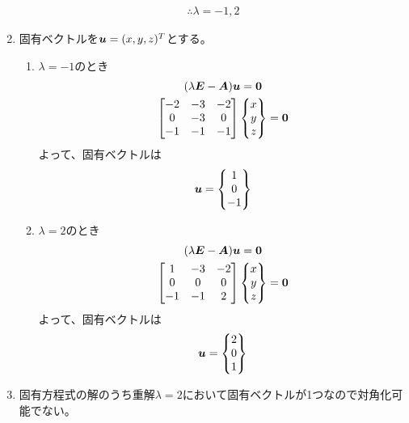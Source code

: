 \begin{ans*}
\begin{enumerate}[label=(\arabic*)]
    \begin{gather}
      \therefore \lambda = -1, 2 
    \end{gather}
    \item 固有ベクトルを${\bm{u}} = (x,y,z)^T$とする。
    \begin{enumerate}[label=(\roman*)]
      \item $\lambda = -1$のとき
      \begin{gather}
        (\lambda\bm{E} - \bm{A}){\bm{u}} = \bm{0} \\
        \begin{bmatrix}
          -2& -3& -2 \\
          0& -3& 0 \\
          -1& -1& -1 \\
        \end{bmatrix}
        \begin{Bmatrix}
          x \\ y \\ z
        \end{Bmatrix}
        =\bm{0} \\
      \end{gather}
      よって、固有ベクトルは
      \begin{gather}
        {\bm{u}} =
        \begin{Bmatrix}
          1 \\ 0 \\ -1
        \end{Bmatrix}
      \end{gather}
      \item $\lambda = 2$のとき
      \begin{gather}
        (\lambda\bm{E} - \bm{A}){\bm{u}} = \bm{0} \\
        \begin{bmatrix}
          1& -3& -2 \\
          0& 0& 0 \\
          -1& -1& 2
        \end{bmatrix}
        \begin{Bmatrix}
          x \\ y \\ z
        \end{Bmatrix}
        =\bm{0} \\
      \end{gather}
      よって、固有ベクトルは
      \begin{gather}
        {\bm{u}} =
        \begin{Bmatrix}
          2 \\ 0 \\ 1
        \end{Bmatrix}
      \end{gather}
    \end{enumerate}
    \item 固有方程式の解のうち重解$\lambda = 2$において固有ベクトルが1つなので対角化可能でない。
  \end{enumerate}
\end{ans*}
